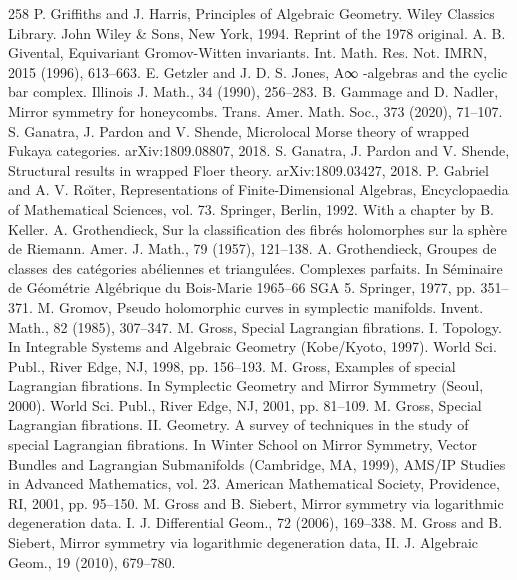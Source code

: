 \begin{thebibliography}{258}
\hypertarget{ref:91}{} P. Griffiths and J. Harris, Principles of Algebraic Geometry. Wiley Classics Library. John Wiley \& Sons, New York, 1994. Reprint of the 1978 original.
\hypertarget{ref:92}{} A. B. Givental, Equivariant Gromov-Witten invariants. Int. Math. Res. Not. IMRN, 2015 (1996), 613–663.
\hypertarget{ref:93}{} E. Getzler and J. D. S. Jones, A∞ -algebras and the cyclic bar complex. Illinois J. Math., 34 (1990), 256–283.
\hypertarget{ref:94}{} B. Gammage and D. Nadler, Mirror symmetry for honeycombs. Trans. Amer. Math. Soc., 373 (2020), 71–107.
\hypertarget{ref:95}{} S. Ganatra, J. Pardon and V. Shende, Microlocal Morse theory of wrapped Fukaya categories. arXiv:1809.08807, 2018.
\hypertarget{ref:96}{} S. Ganatra, J. Pardon and V. Shende, Structural results in wrapped Floer theory. arXiv:1809.03427, 2018.
\hypertarget{ref:97}{} P. Gabriel and A. V. Roı̆ter, Representations of Finite-Dimensional Algebras, Encyclopaedia of Mathematical Sciences, vol. 73. Springer, Berlin, 1992. With a chapter by B. Keller.
\hypertarget{ref:98}{} A. Grothendieck, Sur la classification des fibrés holomorphes sur la sphère de Riemann. Amer. J. Math., 79 (1957), 121–138.
\hypertarget{ref:99}{} A. Grothendieck, Groupes de classes des catégories abéliennes et triangulées. Complexes parfaits. In Séminaire de Géométrie Algébrique du Bois-Marie 1965–66 SGA 5. Springer, 1977, pp. 351–371.
\hypertarget{ref:100}{} M. Gromov, Pseudo holomorphic curves in symplectic manifolds. Invent. Math., 82 (1985), 307–347.
\hypertarget{ref:101}{} M. Gross, Special Lagrangian fibrations. I. Topology. In Integrable Systems and Algebraic Geometry (Kobe/Kyoto, 1997). World Sci. Publ., River Edge, NJ, 1998, pp. 156–193.
\hypertarget{ref:102}{} M. Gross, Examples of special Lagrangian fibrations. In Symplectic Geometry and Mirror Symmetry (Seoul, 2000). World Sci. Publ., River Edge, NJ, 2001, pp. 81–109.
\hypertarget{ref:103}{} M. Gross, Special Lagrangian fibrations. II. Geometry. A survey of techniques in the study of special Lagrangian fibrations. In Winter School on Mirror Symmetry, Vector Bundles and Lagrangian Submanifolds (Cambridge, MA, 1999), AMS/IP Studies in Advanced Mathematics, vol. 23. American Mathematical Society, Providence, RI, 2001, pp. 95–150.
\hypertarget{ref:104}{} M. Gross and B. Siebert, Mirror symmetry via logarithmic degeneration data. I. J. Differential Geom., 72 (2006), 169–338.
\hypertarget{ref:105}{} M. Gross and B. Siebert, Mirror symmetry via logarithmic degeneration data, II. J. Algebraic Geom., 19 (2010), 679–780.

\end{thebibliography}
